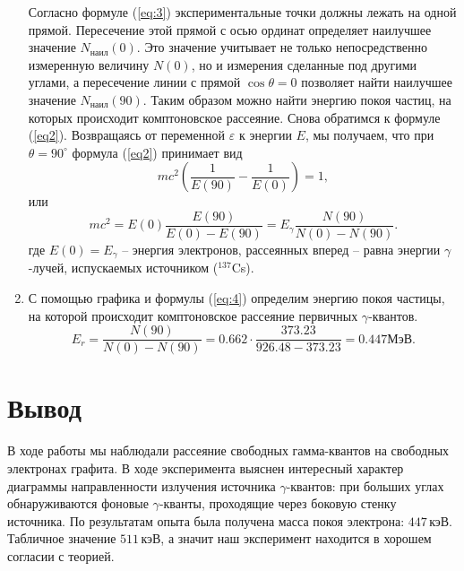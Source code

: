 \documentclass[a4paper, 12pt]{article}
\begin{document}
\begin{enumerate}
	\par
	Согласно формуле (\ref{eq:3}) экспериментальные точки должны лежать на одной прямой. Пересечение этой прямой с осью ординат определяет наилучшее значение $N_{\text{наил}}(0)$. Это значение учитывает не только непосредственно измеренную величину $N(0)$, но и измерения сделанные под другими углами, а пересечение линии с прямой $\cos\theta=0$ позволяет найти наилучшее значение $N_{\text{наил}}(90)$. Таким образом можно найти энергию покоя частиц, на которых происходит комптоновское рассеяние. Снова обратимся к формуле (\ref{eq2}). Возвращаясь от переменной $\varepsilon$ к энергии $E$, мы получаем, что при $\theta=90^\circ$ формула (\ref{eq2}) принимает вид
	\begin{equation*}
		mc^2\left(\frac{1}{E(90)}-\frac{1}{E(0)}\right)=1,
	\end{equation*}
	или
	\begin{equation}
		mc^2=E(0)\frac{E(90)}{E(0)-E(90)}=E_\gamma\frac{N(90)}{N(0)-N(90)}.
		\label{eq:4}
	\end{equation}
	где $E(0)=E_\gamma$ -- энергия электронов, рассеянных вперед -- равна энергии $\gamma$-лучей, испускаемых источником ($^{137}$Cs).\par
	\item С помощью графика и формулы (\ref{eq:4}) определим энергию покоя частицы, на которой происходит комптоновское рассеяние первичных $\gamma$-квантов.
	\begin{equation*}
		E_r=\frac{N(90)}{N(0)-N(90)}=0.662\cdot\frac{373.23}{926.48-373.23}=0.447 \text{МэВ}.
	\end{equation*}
\end{enumerate}
\section{Вывод}
В ходе работы мы наблюдали рассеяние свободных гамма-квантов на свободных электронах графита. В ходе эксперимента выяснен интересный характер диаграммы направленности излучения источника $\gamma$-квантов: при больших углах обнаруживаются фоновые $\gamma$-кванты, проходящие через боковую стенку источника.  По результатам опыта была получена масса покоя электрона: $447\,\text{кэВ}$. Табличное значение $511\,\text{кэВ}$, а значит наш эксперимент находится в хорошем согласии с теорией.
\end{document}

